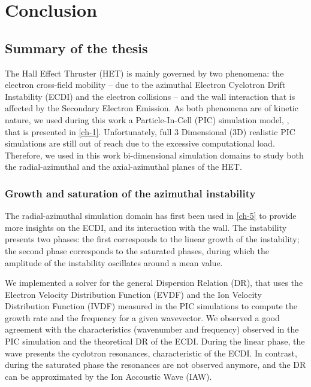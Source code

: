 
\chapter{Conclusion}
\label{ch-conclusion}

\section{Summary of the thesis}

The Hall Effect Thruster (HET) is mainly governed by two phenomena\string: the electron cross-field mobility -- due to the azimuthal Electron Cyclotron Drift Instability (ECDI) and the electron collisions -- and the wall interaction that is affected by the Secondary Electron Emission.
As both phenomena are of kinetic nature, we used during this work a Particle-In-Cell (PIC) simulation model, \LPPic, that is presented in \cref{ch-1}.
Unfortunately, full 3 Dimensional (3D) realistic PIC simulations are still out of reach due to the excessive computational load.
Therefore, we used in this work bi-dimensional simulation domains to study both the radial-azimuthal and the axial-azimuthal planes of the HET.

\subsection{Growth and saturation of the azimuthal instability}

The radial-azimuthal simulation domain has first been used in \cref{ch-5} to provide more insights on the \ac{ECDI}, and its interaction with the wall.
The instability presents two phases\string: the first corresponds to the linear growth of the instability; the second phase corresponds to the saturated phases, during which the amplitude of the instability oscillates around a mean value.

We implemented a solver for the general Dispersion Relation (DR), that uses the Electron Velocity Distribution Function (EVDF) and the Ion Velocity Distribution Function (IVDF) measured in the PIC simulations to compute the growth rate and the frequency for a given wavevector.
We observed a good agreement with the characteristics (wavenumber and frequency) observed in the \ac{PIC} simulation and the theoretical DR of the ECDI.
During the linear phase, the wave presents the cyclotron resonances, characteristic of the ECDI.
In contrast, during the saturated phase the resonances are not observed anymore, and the DR can be approximated by the Ion Accoustic Wave (IAW).

